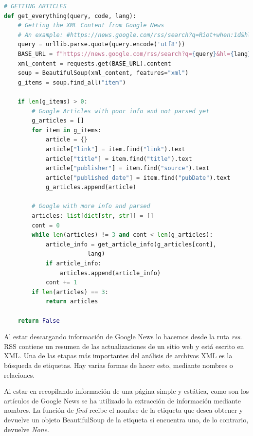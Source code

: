 \begin{lstlisting}[caption=Extracción de las noticias,language=Python, mathescape=true]
# GETTING ARTICLES
def get_everything(query, code, lang):
    # Getting the XML Content from Google News
    # An example: #https://news.google.com/rss/search?q=Riot+when:1d&hl=es&gl=ES&ceid=ES:es
    query = urllib.parse.quote(query.encode('utf8'))
    BASE_URL = f"https://news.google.com/rss/search?q={query}&hl={lang}&gl={code}&ceid={code}:{lang}"
    xml_content = requests.get(BASE_URL).content
    soup = BeautifulSoup(xml_content, features="xml")
    g_items = soup.find_all("item")

    if len(g_items) > 0:
        # Google Articles with poor info and not parsed yet
        g_articles = []
        for item in g_items:
            article = {}
            article["link"] = item.find("link").text
            article["title"] = item.find("title").text
            article["publisher"] = item.find("source").text
            article["published_date"] = item.find("pubDate").text
            g_articles.append(article)

        # Google with more info and parsed
        articles: list[dict[str, str]] = []
        cont = 0
        while len(articles) != 3 and cont < len(g_articles):
            article_info = get_article_info(g_articles[cont],
                        lang)
            if article_info:
                articles.append(article_info)
            cont += 1
        if len(articles) == 3:
            return articles
            
    return False
\end{lstlisting}

Al estar descargando información de Google News lo hacemos desde la ruta \textit{rss}. \ac{RSS} contiene un resumen de las actualizaciones de un sitio web y está escrito en XML. Una de las etapas más importantes del análisis de archivos XML es la búsqueda de etiquetas. Hay varias formas de hacer esto, mediante nombres o relaciones.

\vspace{0.3cm}

Al estar en recopilando información de una página simple y estática, como son los artículos de Google News se ha utilizado la extracción de información mediante nombres. La función de \textit{find} recibe el nombre de la etiqueta que desea obtener y devuelve un objeto BeautifulSoup de la etiqueta si encuentra uno, de lo contrario, devuelve \textit{None}.

\vspace{0.3cm}

